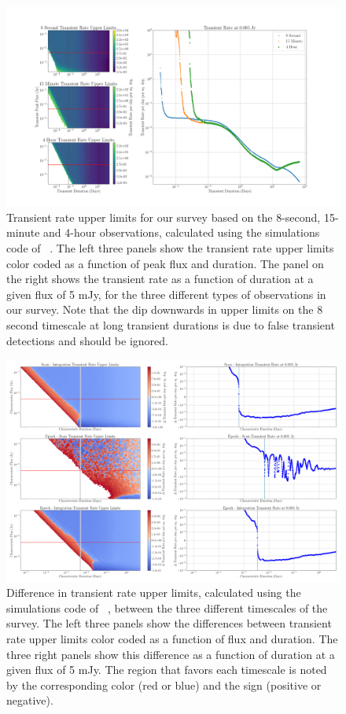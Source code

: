 \documentclass[12pt]{article}
\begin{document}
\begin{figure}
	\includegraphics[width=\textwidth]{allplots.png}
	\caption{Transient rate upper limits for our survey based on the 8-second, 15-minute and 4-hour observations, calculated using the simulations code of ~\citet{2022ascl.soft04007C}. The left three panels show the transient rate upper limits color coded as a function of peak flux and duration. The panel on the right shows the transient rate as a function of duration at a given flux of 5 mJy, for the three different types of observations in our survey. Note that the dip downwards in upper limits on the 8 second timescale at long transient durations is due to false transient detections and should be ignored.}
	\label{fig:threelimits}
\end{figure}

\begin{figure}
	\includegraphics[width=\textwidth]{diffplots.png}
	\caption{Difference in transient rate upper limits, calculated using the simulations code of ~\citet{2022ascl.soft04007C}, between the three different timescales of the survey. The left three panels show the differences between transient rate upper limits color coded as a function of flux and duration. The three right panels show this difference as a function of duration at a given flux of 5 mJy. The region that favors each timescale is noted by the corresponding color (red or blue) and the sign (positive or negative).}
	\label{fig:threediff}
\end{figure}
\end{document}
